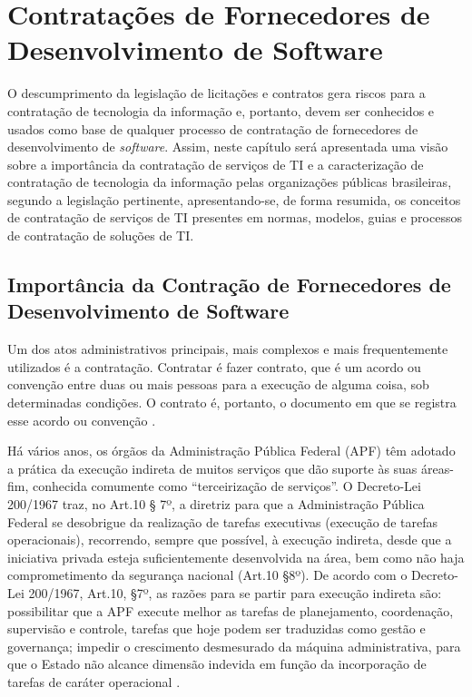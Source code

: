 
\chapter[Contratações de Fornecedores de Desenvolvimento de Software]{Contratações de Fornecedores de Desenvolvimento de Software}

O descumprimento da legislação de licitações e contratos gera riscos para a contratação de tecnologia da informação e, portanto, devem ser conhecidos e usados como base de qualquer processo de contratação de fornecedores de desenvolvimento de \textit{software}. Assim, neste capítulo será apresentada uma visão sobre a importância da contratação de serviços de TI e a caracterização de contratação de tecnologia da informação pelas organizações públicas brasileiras, segundo a legislação pertinente, apresentando-se, de forma resumida, os conceitos de contratação de serviços de TI presentes em normas, modelos, guias e processos de contratação de soluções de TI.

\section[Importância da Contração de Fornecedores de Desenvolvimento de Software]{Importância da Contração de Fornecedores de Desenvolvimento de Software}

Um dos atos administrativos principais, mais complexos e mais frequentemente utilizados é a contratação. Contratar é fazer contrato, que é um acordo ou convenção entre duas ou mais pessoas para a execução de alguma coisa, sob determinadas condições. O contrato é, portanto, o documento em que se registra esse acordo ou convenção \cite{MPOG:2011}.

Há vários anos, os órgãos da Administração Pública Federal (APF) têm adotado a prática da execução indireta de muitos serviços que dão suporte às suas áreas-fim, conhecida comumente como “terceirização de serviços”. O Decreto-Lei 200/1967 traz, no Art.10 § 7º, a diretriz para que a Administração Pública Federal se desobrigue da realização de tarefas executivas (execução de tarefas operacionais), recorrendo, sempre que possível, à execução indireta, desde que a iniciativa privada esteja suficientemente desenvolvida na área, bem como não haja comprometimento da segurança nacional (Art.10 §8º). De acordo com o Decreto-Lei 200/1967, Art.10, §7º, as razões para se partir para execução indireta são: possibilitar que a APF execute melhor as tarefas de planejamento, coordenação, supervisão e controle, tarefas que hoje podem ser traduzidas como gestão e governança; impedir o crescimento desmesurado da máquina administrativa, para que o Estado não alcance dimensão indevida em função da incorporação de tarefas de caráter operacional  \cite{TCU:2012}. 

